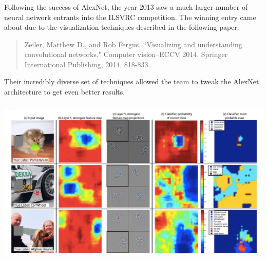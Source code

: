 \documentclass[xetex,mathserif,serif,aspectratio=169]{beamer}
\begin{document}
\begin{frame}[fragile] \frametitle{} \oldB \small


Following the success of AlexNet, the year 2013 saw a much
larger number of neural network entrants into the ILSVRC
competition. The winning entry came about due to the
visualization techniques described in the following paper:
\begin{quote}
Zeiler, Matthew D., and Rob Fergus. ``Visualizing and understanding convolutional networks." Computer vision–ECCV 2014. Springer International Publishing, 2014. 818-833.
\end{quote}
Their incredibly diverse set of techniques allowed the team
to tweak the AlexNet architecture to get even better results.

\end{frame}

\begin{frame}[fragile] \frametitle{} \oldB \small

\begin{center}
\includegraphics[width=\textwidth]{img/vizCover.jpg}
\end{center}

\end{frame}
\end{document}
